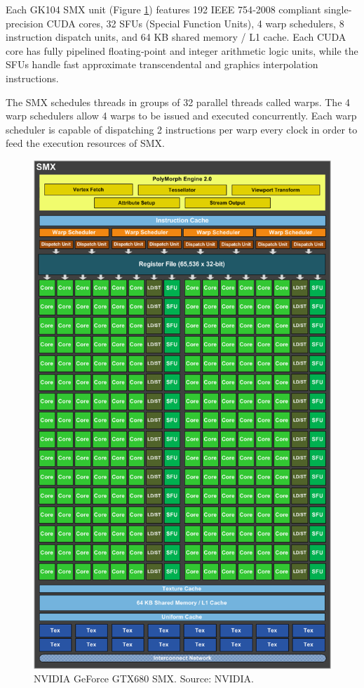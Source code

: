 Each GK104 SMX unit (Figure \ref{GPU:GeForceGTX680SMX}) features 192 IEEE 754‐2008 compliant single‐precision CUDA cores, 32 SFUs (Special Function Units), 4 warp schedulers, 8 instruction dispatch units, and 64 KB shared memory / L1 cache. Each CUDA core has fully pipelined floating‐point and integer arithmetic logic units, while the SFUs handle fast approximate transcendental and graphics interpolation instructions.

The SMX schedules threads in groups of 32 parallel threads called warps. The 4 warp schedulers allow 4 warps to be issued and executed concurrently. Each warp scheduler is capable of dispatching 2 instructions per warp every clock in order to feed the execution resources of SMX.

\begin{figure}
\centering
\includegraphics[width=\textwidth]{GPU/GeForceGTX680SMX.png}
\caption{NVIDIA GeForce GTX680 SMX. Source: NVIDIA.}
\label{GPU:GeForceGTX680SMX}
\end{figure}

